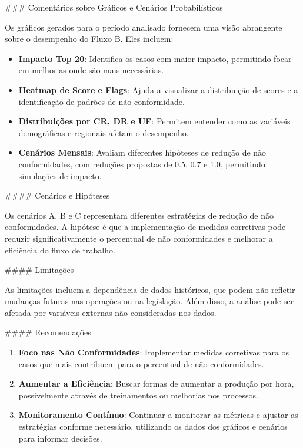 \documentclass[11pt]{article}
\begin{document}
\#\#\# Comentários sobre Gráficos e Cenários Probabilísticos

Os gráficos gerados para o período analisado fornecem uma visão abrangente sobre o desempenho do Fluxo B. Eles incluem:

\begin{itemize}
\item \textbf{\textbf{Impacto Top 20}}: Identifica os casos com maior impacto, permitindo focar em melhorias onde são mais necessárias.
\item \textbf{\textbf{Heatmap de Score e Flags}}: Ajuda a visualizar a distribuição de scores e a identificação de padrões de não conformidade.
\item \textbf{\textbf{Distribuições por CR, DR e UF}}: Permitem entender como as variáveis demográficas e regionais afetam o desempenho.
\item \textbf{\textbf{Cenários Mensais}}: Avaliam diferentes hipóteses de redução de não conformidades, com reduções propostas de 0.5, 0.7 e 1.0, permitindo simulações de impacto.
\end{itemize}

\#\#\#\# Cenários e Hipóteses

Os cenários A, B e C representam diferentes estratégias de redução de não conformidades. A hipótese é que a implementação de medidas corretivas pode reduzir significativamente o percentual de não conformidades e melhorar a eficiência do fluxo de trabalho.

\#\#\#\# Limitações

As limitações incluem a dependência de dados históricos, que podem não refletir mudanças futuras nas operações ou na legislação. Além disso, a análise pode ser afetada por variáveis externas não consideradas nos dados.

\#\#\#\# Recomendações

\begin{enumerate}
\item \textbf{\textbf{Foco nas Não Conformidades}}: Implementar medidas corretivas para os casos que mais contribuem para o percentual de não conformidades.
\item \textbf{\textbf{Aumentar a Eficiência}}: Buscar formas de aumentar a produção por hora, possivelmente através de treinamentos ou melhorias nos processos.
\item \textbf{\textbf{Monitoramento Contínuo}}: Continuar a monitorar as métricas e ajustar as estratégias conforme necessário, utilizando os dados dos gráficos e cenários para informar decisões.
\end{enumerate}
\end{document}
